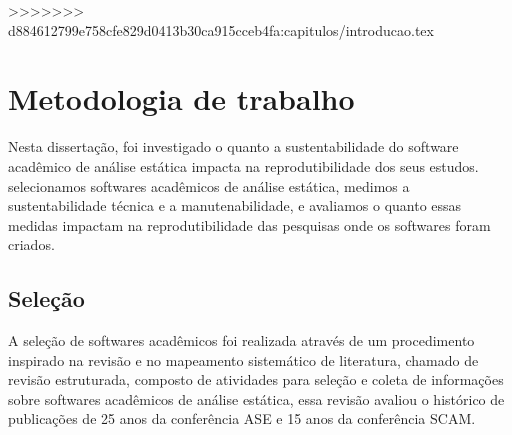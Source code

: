 %
%
>>>>>>> d884612799e758cfe829d0413b30ca915cceb4fa:capitulos/introducao.tex

\section{Metodologia de trabalho}

Nesta dissertação, foi investigado o quanto a sustentabilidade do software
acadêmico de análise estática impacta na reprodutibilidade dos seus estudos.
selecionamos softwares acadêmicos de análise estática, medimos a
sustentabilidade técnica e a manutenabilidade, e avaliamos o quanto essas medidas
impactam na reprodutibilidade das pesquisas onde os softwares foram criados.

\subsection{Seleção}

A seleção de softwares acadêmicos foi realizada através de um procedimento
inspirado na revisão e no mapeamento sistemático de literatura, chamado de
revisão estruturada, composto de atividades para seleção e coleta de
informações sobre softwares acadêmicos de análise estática, essa revisão
avaliou o histórico de publicações de 25 anos da conferência ASE e 15 anos da
conferência SCAM.

